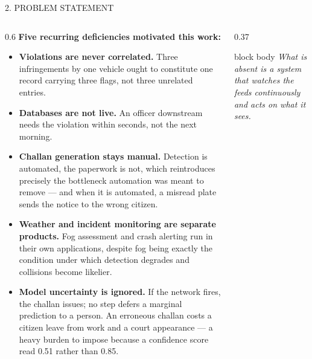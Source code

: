 \documentclass[aspectratio=169,10pt,t]{beamer}
\newcommand{\hd}[1]{{\color{dsblue}\textbf{#1}}}          %
\begin{document}
\begin{frame}{2. PROBLEM STATEMENT}
\small
\begin{columns}[T,onlytextwidth]
\begin{column}{0.6\textwidth}
\hd{Five recurring deficiencies motivated this work:}
\scriptsize
\begin{itemize}\setlength{\itemsep}{0.2em}
\item \textbf{Violations are never correlated.} Three infringements by one vehicle ought to constitute one record
carrying three flags, not three unrelated entries.
\item \textbf{Databases are not live.} An officer downstream needs the violation within seconds, not the next morning.
\item \textbf{Challan generation stays manual.} Detection is automated, the paperwork is not, which reintroduces
precisely the bottleneck automation was meant to remove --- and when it is automated, a misread plate sends the notice
to the wrong citizen.
\item \textbf{Weather and incident monitoring are separate products.} Fog assessment and crash alerting run in their
own applications, despite fog being exactly the condition under which detection degrades and collisions become likelier.
\item \textbf{Model uncertainty is ignored.} If the network fires, the challan issues; no step defers a marginal
prediction to a person. An erroneous challan costs a citizen leave from work and a court appearance --- a heavy burden
to impose because a confidence score read 0.51 rather than 0.85.
\end{itemize}
\end{column}
\begin{column}{0.37\textwidth}
\vspace{0.2em}
\begin{beamercolorbox}[sep=0.5em,rounded=true]{block body}
\footnotesize\itshape
What is absent is a system that watches the feeds continuously and acts on what it sees.
\end{beamercolorbox}
\vspace{0.8em}
\centering
{}
\end{column}
\end{columns}
\end{frame}
\end{document}

